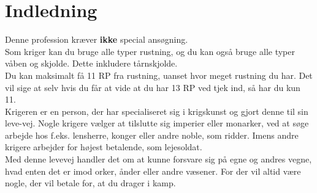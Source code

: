 \chapter{Indledning}
Denne profession kræver \textbf{ikke} special ansøgning.\\
Som kriger kan du bruge alle typer rustning, og du kan også bruge alle typer våben og skjolde. Dette inkludere tårnskjolde.\\
Du kan maksimalt få 11 RP fra rustning, uanset hvor meget rustning du har. Det vil sige at selv hvis du får at vide at du har 13 RP ved tjek ind, så har du kun 11.\\

Krigeren er en person, der har specialiseret sig i krigskunst og gjort denne til sin leve-vej. Nogle krigere vælger at tilslutte sig imperier eller monarker, ved at søge arbejde hos f.eks. lensherre, konger eller andre noble, som ridder. Imens andre krigere arbejder for højest betalende, som lejesoldat.\\
Med denne levevej handler det om at kunne forsvare sig på egne og andres vegne, hvad enten det er imod orker, ånder eller andre væsener. For der vil altid være nogle, der vil betale for, at du drager i kamp.\\
